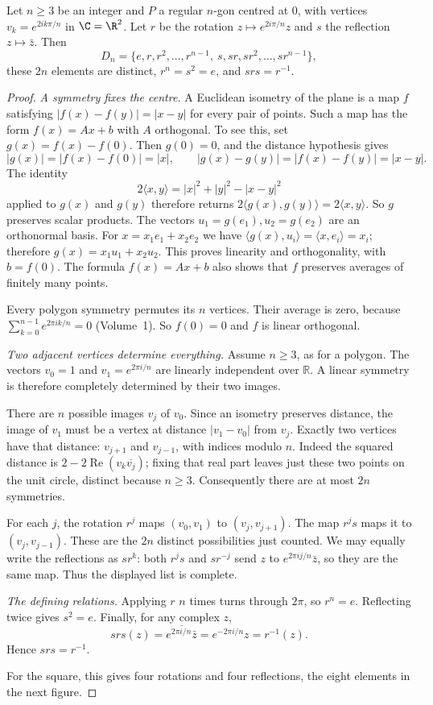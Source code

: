 \begin{proposition}\label{prop:dihedral}
Let $n\ge3$ be an integer and $P$ a regular $n$-gon centred at $0$, with vertices $v_k=e^{2ik\pi/n}$ in $\C=\R^2$. Let $r$ be the rotation $z\mapsto e^{2i\pi/n}z$ and $s$ the reflection $z\mapsto\bar z$. Then
\[
D_n=\{e,r,r^2,\dots,r^{n-1},\ s,sr,sr^2,\dots,sr^{n-1}\},
\]
these $2n$ elements are distinct, $r^n=s^2=e$, and $srs=r^{-1}$.
\end{proposition}
\begin{proof}
\emph{A symmetry fixes the centre.}
A Euclidean isometry of the plane is a map $f$ satisfying $|f(x)-f(y)|=|x-y|$ for every pair of points. Such a map has the form $f(x)=Ax+b$ with $A$ orthogonal. To see this, set $g(x)=f(x)-f(0)$. Then $g(0)=0$, and the distance hypothesis gives
\[
|g(x)|=|f(x)-f(0)|=|x|,
\qquad
|g(x)-g(y)|=|f(x)-f(y)|=|x-y|.
\]
The identity
\[
2\langle x,y\rangle=|x|^2+|y|^2-|x-y|^2
\]
applied to $g(x)$ and $g(y)$ therefore returns $2\langle g(x),g(y)\rangle=2\langle x,y\rangle$. So $g$ preserves scalar products. The vectors
$u_1=g(e_1),u_2=g(e_2)$ are an orthonormal basis.
For $x=x_1e_1+x_2e_2$ we have
$\langle g(x),u_i\rangle=\langle x,e_i\rangle=x_i$;
therefore $g(x)=x_1u_1+x_2u_2$. This proves linearity and
orthogonality, with $b=f(0)$. The formula $f(x)=Ax+b$
also shows that $f$ preserves averages of finitely many points.

Every polygon symmetry permutes its $n$ vertices.
Their average is zero, because
$\sum_{k=0}^{n-1}e^{2\pi ik/n}=0$ (Volume~1).
So $f(0)=0$ and $f$ is linear orthogonal.

\emph{Two adjacent vertices determine everything.}
Assume $n\ge3$, as for a polygon. The vectors
$v_0=1$ and $v_1=e^{2\pi i/n}$ are linearly
independent over $\mathbb R$. A linear symmetry
is therefore completely determined by their two images.

There are $n$ possible images $v_j$ of $v_0$.
Since an isometry preserves distance, the image of
$v_1$ must be a vertex at distance $|v_1-v_0|$
from $v_j$. Exactly two vertices have that distance:
$v_{j+1}$ and $v_{j-1}$, with indices modulo $n$.
Indeed the squared distance is
$2-2\operatorname{Re}(v_k\overline{v_j})$; fixing that real part
leaves just these two points on the unit circle, distinct because $n\ge3$.
Consequently there are at most $2n$ symmetries.

For each $j$, the rotation $r^j$ maps $(v_0,v_1)$
to $(v_j,v_{j+1})$. The map $r^js$ maps it to
$(v_j,v_{j-1})$. These are the $2n$ distinct
possibilities just counted. We may equally write
the reflections as $sr^k$: both $r^js$ and $sr^{-j}$ send $z$ to
$e^{2\pi ij/n}\bar z$, so they are the same map.
Thus the displayed list is complete.

\emph{The defining relations.}
Applying $r$ $n$ times turns through $2\pi$,
so $r^n=e$. Reflecting twice gives $s^2=e$.
Finally, for any complex $z$,
\[
srs(z)
=\overline{e^{2\pi i/n}\bar z}
=e^{-2\pi i/n}z
=r^{-1}(z).
\]
Hence $srs=r^{-1}$.

For the square, this gives four rotations and four reflections,
the eight elements in the next figure.
\end{proof}

